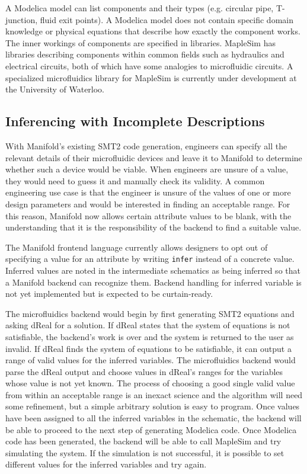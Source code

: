 A Modelica model can list components and their types (e.g. circular pipe, T-junction, fluid exit points).
A Modelica model does not contain specific domain knowledge or physical equations that describe how exactly the component works.
The inner workings of components are specified in libraries.
MapleSim has libraries describing components within common fields such as hydraulics and electrical circuits, both of which have some analogies to microfluidic circuits.
A specialized microfluidics library for MapleSim is currently under development at the University of Waterloo.

\subsection{Inferencing with Incomplete Descriptions}

With Manifold's existing SMT2 code generation, engineers can specify all the relevant details of their microfluidic devices and leave it to Manifold to determine whether such a device would be viable.
When engineers are unsure of a value, they would need to guess it and manually check its validity.
A common engineering use case is that the engineer is unsure of the values of one or more design parameters and would be interested in finding an acceptable range.
For this reason, Manifold now allows certain attribute values to be blank, with the understanding that it is the responsibility of the backend to find a suitable value.

The Manifold frontend language currently allows designers to opt out of specifying a value for an attribute by writing {\tt infer} instead of a concrete value.
Inferred values are noted in the intermediate schematics as being inferred so that a Manifold backend can recognize them.
Backend handling for inferred variable is not yet implemented but is expected to be curtain-ready.


The microfluidics backend would begin by first generating SMT2 equations and asking dReal for a solution.
If dReal states that the system of equations is not satisfiable, the backend's work is over and the system is returned to the user as invalid.
If dReal finds the system of equations to be satisfiable, it can output a range of valid values for the inferred variables.
The microfluidics backend would parse the dReal output and choose values in dReal's ranges for the variables whose value is not yet known.
The process of choosing a good single valid value from within an acceptable range is an inexact science and the algorithm will need some refinement, but a simple arbitrary solution is easy to program.
Once values have been assigned to all the inferred variables in the schematic, the backend will be able to proceed to the next step of generating Modelica code.
Once Modelica code has been generated, the backend will be able to call MapleSim and try simulating the system.
If the simulation is not successful, it is possible to set different values for the inferred variables and try again.

